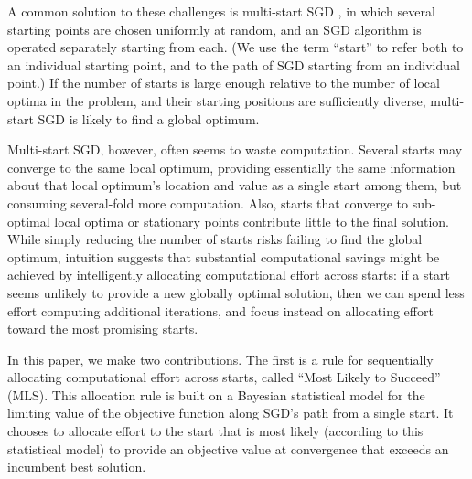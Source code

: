 \documentclass[12pt,english]{article}
\newcommand{\abbrv}{MLS}
\newcommand{\name}{Most Likely to Succeed}
\begin{document}
A common solution to these challenges is multi-start SGD \citep{schoen:1991,marti:2016}, in which several starting points are chosen uniformly at random, and an SGD algorithm is operated separately starting from each.
(We use the term ``start'' to refer both to an individual starting point, and to the path of SGD starting from an individual point.)
If the number of starts is large enough relative to the number of local optima in the problem, and their starting positions are sufficiently diverse, multi-start SGD is likely to find a global optimum.  

Multi-start SGD, however, often seems to waste computation.  Several starts may converge to the same local optimum, providing essentially the same information about that local optimum's location and value as a single start among them, but consuming several-fold more computation. Also, starts that converge to sub-optimal local optima or stationary points contribute little to the final solution.
While simply reducing the number of starts risks failing to find the global optimum, intuition suggests that substantial computational savings might be achieved by intelligently allocating computational effort across starts: if a start seems unlikely to provide a new globally optimal solution, then we can spend less effort computing additional iterations, and focus instead on allocating effort toward the most promising starts.


In this paper, we make two contributions. The first is a rule for sequentially allocating computational effort across starts, called ``\name'' (\abbrv).  This allocation rule is built on a Bayesian statistical model for the limiting value of the objective function along SGD's path from a single start.  It chooses to allocate effort to the start that is most likely (according to this statistical model) to provide an objective value at convergence that exceeds an incumbent best solution.

\end{document}

